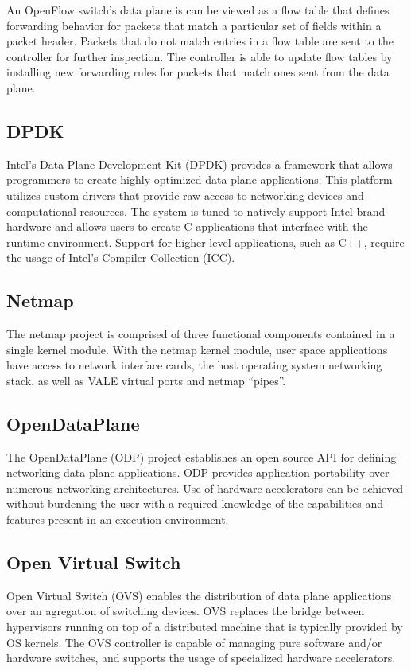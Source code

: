 An OpenFlow switch's data plane is can be viewed as a flow table that defines
forwarding behavior for packets that match a particular set of fields within
a packet header. Packets that do not match entries in a flow table are sent
to the controller for further inspection. The controller is able to update flow
tables by installing new forwarding rules for packets that match ones sent
from the data plane.

\subsection{DPDK}
\label{related:dpdk}
Intel's Data Plane Development Kit (DPDK) \cite{dpdk} provides a framework that
allows programmers to create highly optimized data plane applications. This
platform utilizes custom drivers that provide raw access to networking devices
and computational resources. The system is tuned to natively support Intel
brand hardware and allows users to create C applications that interface with
the runtime environment. Support for higher level applications, such as C++,
require the usage of Intel's Compiler Collection (ICC).

\subsection{Netmap}
\label{related:netmap}
The netmap project \cite{netmap} is comprised of three functional components
contained in a single kernel module. With the netmap kernel module, user space
applications have access to network interface cards, the host operating system
networking stack, as well as VALE virtual ports and netmap ``pipes''.

\subsection{OpenDataPlane}
\label{related:odp}
The OpenDataPlane (ODP) project \cite{odp} establishes an open source API for
defining networking data plane applications. ODP provides application
portability over numerous networking architectures. Use of hardware
accelerators can be achieved without burdening the user with a required
knowledge of the capabilities and features present in an execution environment.

\subsection{Open Virtual Switch}
\label{related:ovs}
Open Virtual Switch (OVS) \cite{ovs} enables the distribution of data
plane applications over an agregation of switching devices. OVS replaces
the bridge between hypervisors running on top of a distributed machine that
is typically provided by OS kernels. The OVS controller is capable of managing
pure software and/or hardware switches, and supports the usage of specialized
hardware accelerators.

